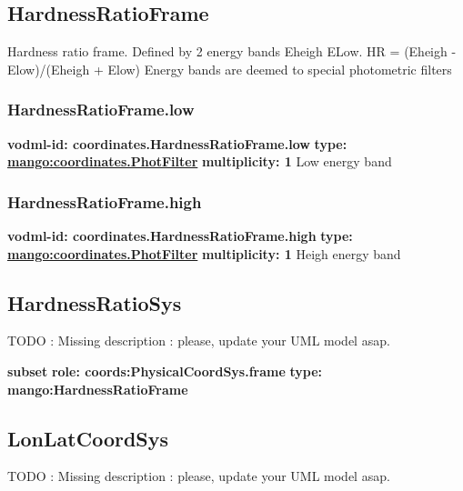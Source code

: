   \subsection{HardnessRatioFrame}
  \label{sect:coordinates.HardnessRatioFrame}
    Hardness ratio frame. Defined by 2 energy bands Eheigh ELow. HR = (Eheigh - Elow)/(Eheigh + Elow) Energy bands are deemed to special photometric filters

    \subsubsection{HardnessRatioFrame.low}
      \textbf{vodml-id: coordinates.HardnessRatioFrame.low} \newline
      \textbf{type: \hyperref[sect:coordinates.PhotFilter]{mango:coordinates.PhotFilter}} \newline
      \textbf{multiplicity: 1} \newline 
      Low energy band

    \subsubsection{HardnessRatioFrame.high}
      \textbf{vodml-id: coordinates.HardnessRatioFrame.high} \newline
      \textbf{type: \hyperref[sect:coordinates.PhotFilter]{mango:coordinates.PhotFilter}} \newline
      \textbf{multiplicity: 1} \newline 
      Heigh energy band

  \subsection{HardnessRatioSys}
  \label{sect:coordinates.HardnessRatioSys}
    TODO : Missing description : please, update your UML model asap.

    \noindent \textbf{subset} \newline
    \indent   \textbf{role: coords:PhysicalCoordSys.frame} \newline
    \indent   \textbf{type: mango:HardnessRatioFrame} \newline


  \subsection{LonLatCoordSys}
  \label{sect:coordinates.LonLatCoordSys}
    TODO : Missing description : please, update your UML model asap.


